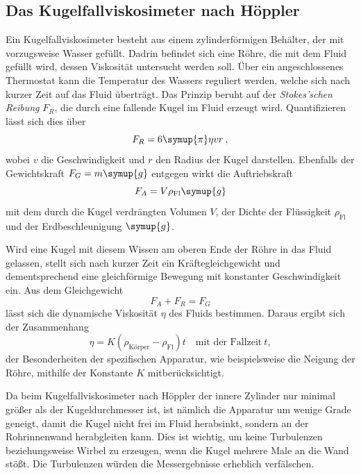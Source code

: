 \FloatBarrier 

\subsection{Das Kugelfallviskosimeter nach Höppler}
\label{sub:hoppla}

Ein Kugelfallviskosimeter besteht aus einem zylinderförmigen Behälter, der mit vorzugsweise Wasser gefüllt. 
Dadrin befindet sich eine Röhre, die mit dem Fluid gefüllt wird, dessen Viskosität untersucht werden soll.
Über ein angeschlossenes Thermostat kann die Temperatur des Wassers reguliert werden, welche sich nach kurzer Zeit auf 
das Fluid überträgt. 
Das Prinzip beruht auf der \textit{Stokes'schen Reibung} $F_R$, die durch eine fallende Kugel im Fluid erzeugt wird. 
Quantifizieren lässt sich dies über 
\begin{equation}
    F_R = 6 \symup{\pi} \eta v r \:,
    \label{eqn:stokes}
\end{equation}
wobei $v$ die Geschwindigkeit und $r$ den Radius der Kugel darstellen. 
Ebenfalls der Gewichtskraft ${F_G = m\symup{g}}$ entgegen wirkt die Auftriebskraft 
\begin{equation}
    F_A = V \rho _\text{Fl} \symup{g} 
    \label{eqn:archimedes}
\end{equation}
mit dem durch die Kugel verdrängten Volumen $V$, der Dichte der Flüssigkeit $\rho _\text{Fl}$ und der Erdbeschleunigung $\symup{g}$. 

Wird eine Kugel mit diesem Wissen am oberen Ende der Röhre in das Fluid gelassen, stellt sich nach kurzer Zeit ein Kräftegleichgewicht 
und dementsprechend eine gleichförmige Bewegung mit konstanter Geschwindigkeit ein. 
Aus dem Gleichgewicht 
\begin{equation}
    F_A + F_R = F_G
    \label{eqn:fix} %
\end{equation}
lässt sich die dynamische Viskosität $\eta$ des Fluids bestimmen.
Daraus ergibt sich der Zusammenhang 
\begin{equation}
    \eta = K (\rho _\text{Körper} - \rho _\text{Fl}) t \quad \text{mit der Fallzeit} \: t ,
    \label{eqn:exp_visk}
\end{equation}
der Besonderheiten der spezifischen Apparatur, wie beispielsweise die Neigung der Röhre, mithilfe der Konstante $K$ mitberücksichtigt. 

Da beim Kugelfallviskosimeter nach Höppler der innere Zylinder nur minimal größer als der Kugeldurchmesser ist, 
ist nämlich die Apparatur um wenige Grade geneigt, damit die Kugel nicht frei im Fluid herabsinkt, sondern an der Rohrinnenwand 
herabgleiten kann. 
Dies ist wichtig, um keine Turbulenzen beziehungsweise Wirbel zu erzeugen, wenn die Kugel mehrere Male an die Wand stößt. 
Die Turbulenzen würden die Messergebnisse erheblich verfälschen. 

